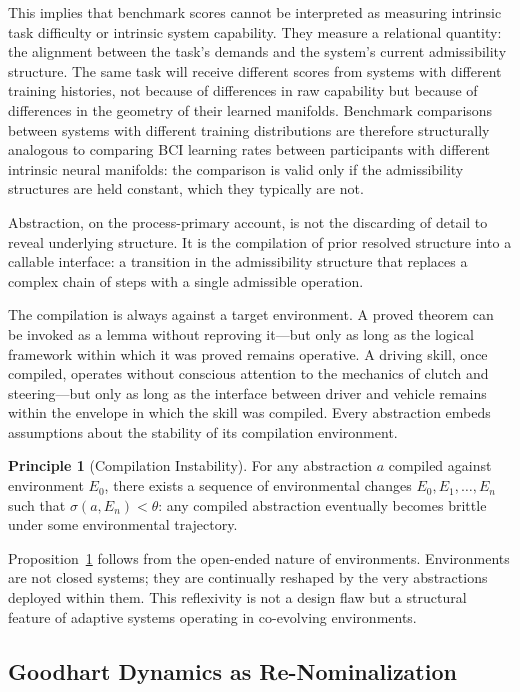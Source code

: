 \documentclass[12pt, a4paper]{article}
\theoremstyle{plain}
\theoremstyle{definition}
\newtheorem{principle}[theorem]{Principle}
\theoremstyle{remark}
\begin{document}
This implies that benchmark scores cannot be interpreted as measuring
intrinsic task difficulty or intrinsic system capability. They measure
a relational quantity: the alignment between the task's demands and
the system's current admissibility structure. The same task will receive
different scores from systems with different training histories, not
because of differences in raw capability but because of differences in
the geometry of their learned manifolds. Benchmark comparisons between
systems with different training distributions are therefore structurally
analogous to comparing BCI learning rates between participants with
different intrinsic neural manifolds: the comparison is valid only if
the admissibility structures are held constant, which they typically
are not.

Abstraction, on the process-primary account, is not the discarding of detail
to reveal underlying structure. It is the compilation of prior resolved
structure into a callable interface: a transition in the admissibility
structure that replaces a complex chain of steps with a single admissible
operation.

The compilation is always against a target environment. A proved theorem can
be invoked as a lemma without reproving it---but only as long as the logical
framework within which it was proved remains operative. A driving skill, once
compiled, operates without conscious attention to the mechanics of clutch and
steering---but only as long as the interface between driver and vehicle remains
within the envelope in which the skill was compiled. Every abstraction embeds
assumptions about the stability of its compilation environment.

\begin{principle}[Compilation Instability]
\label{prop:instability}
For any abstraction $a$ compiled against environment $E_0$, there exists
a sequence of environmental changes $E_0, E_1, \ldots, E_n$ such that
$\sigma(a, E_n) < \theta$: any compiled abstraction eventually becomes
brittle under some environmental trajectory.
\end{principle}

Proposition~\ref{prop:instability} follows from the open-ended nature of
environments. Environments are not closed systems; they are continually
reshaped by the very abstractions deployed within them. This reflexivity is
not a design flaw but a structural feature of adaptive systems operating in
co-evolving environments.

\subsection{Goodhart Dynamics as Re-Nominalization}
\end{document}

